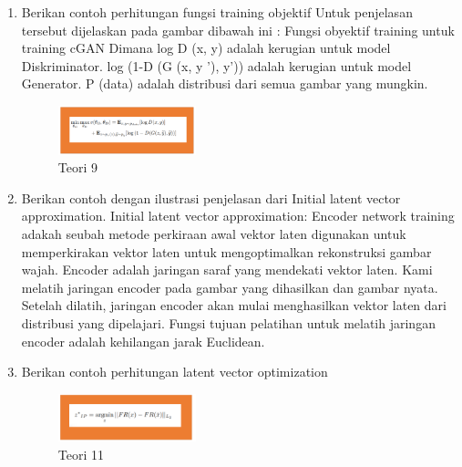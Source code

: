 \begin{enumerate}
	\item Berikan contoh perhitungan fungsi training objektif
	\hfill\break
	Untuk penjelasan tersebut dijelaskan pada gambar dibawah ini :
	Fungsi obyektif training untuk training cGAN Dimana log D (x, y) adalah kerugian untuk model Diskriminator. log (1-D (G (x, y ’), y’)) adalah kerugian untuk model Generator. P (data) adalah distribusi dari semua gambar yang mungkin.
	\begin{figure}[H]
		\includegraphics[width=4cm]{figures/1174027/9/teori9.png}
		\centering
		\caption{Teori 9}
	\end{figure}

	\item Berikan contoh dengan ilustrasi penjelasan dari Initial latent vector approximation.
	\hfill\break
	Initial latent vector approximation: Encoder network training adakah seubah metode perkiraan awal vektor laten digunakan untuk memperkirakan vektor laten untuk mengoptimalkan rekonstruksi gambar wajah. Encoder adalah jaringan saraf yang mendekati vektor laten. Kami melatih jaringan encoder pada gambar yang dihasilkan dan gambar nyata. Setelah dilatih, jaringan encoder akan mulai menghasilkan vektor laten dari distribusi yang dipelajari. Fungsi tujuan pelatihan untuk melatih jaringan encoder adalah kehilangan jarak Euclidean.

	\item Berikan contoh perhitungan latent vector optimization
	\hfill\break
	\begin{figure}[H]
		\includegraphics[width=4cm]{figures/1174027/9/teori11.png}
		\centering
		\caption{Teori 11}
	\end{figure}
\end{enumerate}
